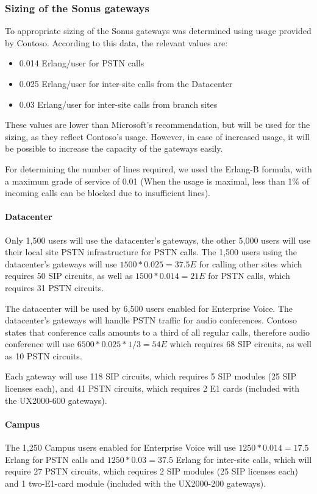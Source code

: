 	
\subsubsection{Sizing of the Sonus gateways}
	To appropriate sizing of the Sonus gateways was determined using usage provided by Contoso. According to this data, the relevant values are: 
	\begin{itemize}
		\item 0.014 Erlang/user for PSTN calls
		\item 0.025 Erlang/user for inter-site calls from the Datacenter
		\item 0.03 Erlang/user for inter-site calls from branch sites
	\end{itemize}
	These values are lower than Microsoft's recommendation, but will be used for the sizing, as they reflect Contoso's usage. However, in case of increased usage, it will be possible to increase the capacity of the gateways easily.
	
	For determining the number of lines required, we used the Erlang-B formula, with a maximum grade of service of 0.01 (When the usage is maximal, less than 1\% of incoming calls can be blocked due to insufficient lines)\cite{qiao_robust_1998}.
	
	
	\paragraph{Datacenter}
	Only 1,500 users will use the datacenter's gateways, the other 5,000 users will use their local site PSTN infrastructure for PSTN calls. The 1,500 users using the datacenter's gateways will use $1500*0.025 = 37.5 E$ for calling other sites which requires 50 SIP circuits, as well as $1500*0.014 = 21 E$ for PSTN calls, which requires 31 PSTN circuits.
	
	The datacenter will be used by 6,500 users enabled for Enterprise Voice. The datacenter's gateways will handle PSTN traffic for audio conferences. Contoso states that conference calls amounts to a third of all regular calls, therefore audio conference will use $6500 * 0.025 * 1/3 = 54 E$ which requires 68 SIP circuits, as well as 10 PSTN circuits.
	
	Each gateway will use 118 SIP circuits, which requires 5 SIP modules (25 SIP licenses each), and 41 PSTN circuits, which requires 2 E1 cards (included with the UX2000-600 gateways).
	
	\paragraph{Campus}
	The 1,250 Campus users enabled for Enterprise Voice will use $1250 * 0.014 = 17.5$ Erlang for PSTN calls and $1250 * 0.03 = 37.5$ Erlang for inter-site calls, which will require 27 PSTN circuits, which requires 2 SIP modules (25 SIP licenses each) and 1 two-E1-card module (included with the UX2000-200 gateways).
	

